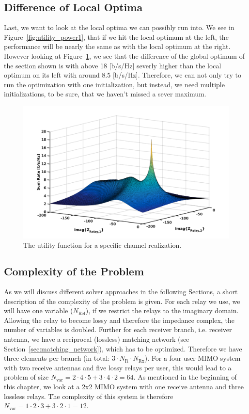 \subsection{Difference of Local Optima}
\label{sec:}


Last, we want to look at the local optima we can possibly run into.
We see in Figure~\ref{fig:utility_power1}, that if we hit the local optimum at the left, the performance will be nearly the same as with the local optimum at the right.
However looking at Figure~\ref{fig:utility_power4}, we see that the difference of the global optimum of the section shown is with above 18 [b/s/Hz] severly higher than the local optimum on its left with around 8.5 [b/s/Hz].
Therefore, we can not only try to run the optimization with one initialization, but instead, we need multiple initializations, to be sure, that we haven't missed a sever maximum.
\begin{figure}[h]
\centering
  \includegraphics[width=0.8\linewidth]{images/full_mesh_highsnr_94.png}
\caption{The utility function for a specific channel realization.}
\label{fig:utility_power4}
\end{figure}

\subsection{Complexity of the Problem}
\label{sec:}

As we will discuss different solver approaches in the following Sections, a short description of the complexity of the problem is given.
For each relay we use, we will have one variable ($N_\text{Rel}$), if we restrict the relays to the imaginary domain.
Allowing the relay to become lossy and therefore the impedance complex, the number of variables is doubled.%
Further for each receiver branch, i.e. receiver antenna, we have a reciprocal (lossless) matching network (see Section~\ref{sec:matching_network}), which has to be optimized.
Therefore we have three elements per branch (in total: $3\cdot N_\text{R}\cdot N_\text{Rx}$).
For a four user MIMO system with two receive antennas and five lossy relays per user, this would lead to a problem of size $N_\text{var} =  2\cdot 4\cdot 5 + 3\cdot 4\cdot 2 = 64$.
As mentioned in the beginning of this chapter, we look at a 2x2 MIMO system with one receive antenna and three lossless relays.
The complexity of this system is therefore $N_\text{var} =  1\cdot 2\cdot 3 + 3\cdot 2\cdot 1 = 12$.

